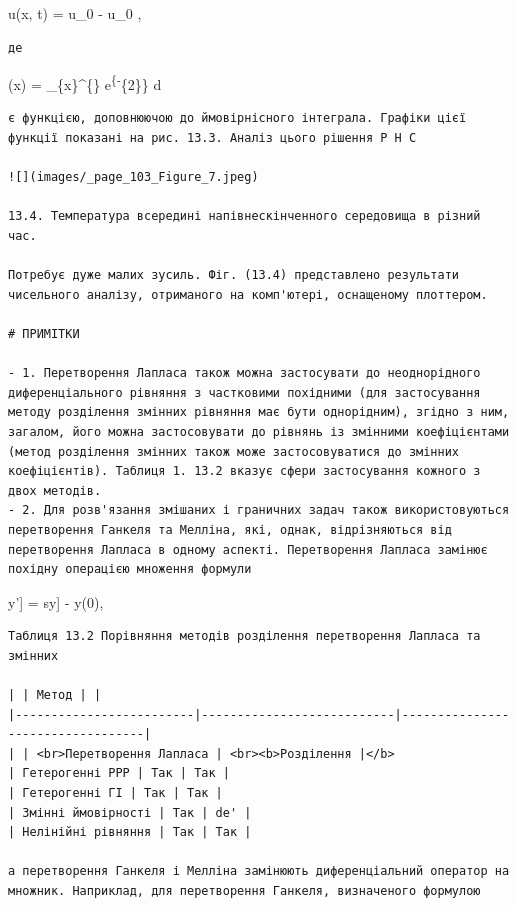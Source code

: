 \documentclass[
  ukrainian,
]{article}
\begin{document}
u(x, t) = u\_0 - u\_0
,

\begin{verbatim}
де
\end{verbatim}

(x) =  \int\_\{x\}\^{}\{\infty\}
e\textsuperscript{\{-\xi}\{2\}\} d\xi

\begin{verbatim}
є функцією, доповнюючою до ймовірнісного інтеграла. Графіки цієї функції показані на рис. 13.3. Аналіз цього рішення P H C

![](images/_page_103_Figure_7.jpeg)

13.4. Температура всередині напівнескінченного середовища в різний час.

Потребує дуже малих зусиль. Фіг. (13.4) представлено результати чисельного аналізу, отриманого на комп'ютері, оснащеному плоттером.

# ПРИМІТКИ

- 1. Перетворення Лапласа також можна застосувати до неоднорідного диференціального рівняння з частковими похідними (для застосування методу розділення змінних рівняння має бути однорідним), згідно з ним, загалом, його можна застосовувати до рівнянь із змінними коефіцієнтами (метод розділення змінних також може застосовуватися до змінних коефіцієнтів). Таблиця 1. 13.2 вказує сфери застосування кожного з двох методів.
- 2. Для розв'язання змішаних і граничних задач також використовуються перетворення Ганкеля та Мелліна, які, однак, відрізняються від перетворення Лапласа в одному аспекті. Перетворення Лапласа замінює похідну операцією множення формули
\end{verbatim}

\mathscr{L}{[}y'{]} = s\mathscr{L}{[}y{]} - y(0),

\begin{verbatim}
Таблиця 13.2 Порівняння методів розділення перетворення Лапласа та змінних

| | Метод | |
|-------------------------|---------------------------|----------------------------------|
| | <br>Перетворення Лапласа | <br><b>Розділення |</b>
| Гетерогенні PPP | Так | Так |
| Гетерогенні ГІ | Так | Так |
| Змінні ймовірності | Так | de' |
| Нелінійні рівняння | Так | Так |

а перетворення Ганкеля і Мелліна замінюють диференціальний оператор на множник. Наприклад, для перетворення Ганкеля, визначеного формулою
\end{verbatim}
\end{document}
